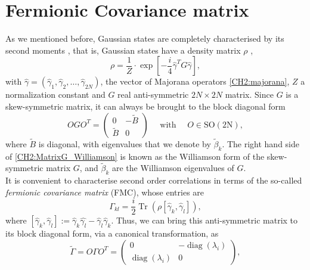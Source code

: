 \section{Fermionic Covariance matrix }
As we mentioned before, Gaussian states are completely characterised by its second moments \cite{westwanski_general_1973,molinari_notes_2017}, that is, Gaussian states have a density matrix $\rho$ \cite{cheong_many-body_2003},
\begin{equation}
\rho= \frac{1}{Z} \cdot \exp \left[-\frac{i}{4} \hat{\gamma}^{T} G \hat{\gamma}\right],
\label{CH2:rho_gaussiano_exp}
\end{equation}
with $\hat{\gamma} = (\hat{\gamma}_1,\hat{\gamma}_2,\ldots,\hat{\gamma}_{2N})$, the vector of Majorana operators \eqref{CH2:majorana}, $Z$ a normalization constant and $G$ real anti-symmetric $2N\times 2N$ matrix. Since $G$ is a skew-symmetric matrix, it can always be brought to the block diagonal form 
\begin{equation}
O G O^{T}=\left(\begin{array}{cc}
0 & -\tilde{B} \\
\tilde{B} & 0
\end{array}\right) \quad \text { with } \quad O \in \mathrm{SO}(2 \mathrm{N}),
\label{CH2:MatrixG_Williamson}
\end{equation}
where $\tilde{B}$ is diagonal, with eigenvalues that we denote by $\tilde{\beta}_k$. The right hand side of \eqref{CH2:MatrixG_Williamson} is known as the Williamson form of the skew-symmetric matrix $G$, and $\tilde{\beta}_k$ are the Williamson eigenvalues of $G$\cite{kraus_pairing_2009}.\\
\indent It is convenient to characterise second order correlations in terms of the so-called \textit{fermionic covariance matrix} (FMC), whose entries are
\begin{equation}
\Gamma_{k l}=\frac{i}{2} \operatorname{Tr}\left(\rho\left[\hat{\gamma}_{k}, \hat{\gamma}_{l}\right]\right),
\label{CH2:Cov_matrix_elements}
\end{equation}
where $\left[\hat{\gamma}_{k}, \hat{\gamma}_{l}\right] := \hat{\gamma}_{k}\hat{\gamma_{l}} - \hat{\gamma}_{l}\hat{\gamma}_{k}$. Thus, we can bring this anti-symmetric matrix to its block diagonal form, via a canonical transformation, as
\begin{equation}
\tilde{\Gamma} = O \Gamma O^{T}=\left(\begin{array}{cc}
0 & -\operatorname{diag}(\lambda_{i}) \\
\operatorname{diag}(\lambda_{i}) & 0
\end{array}\right),
\label{CH2:Williamson_Cov_fermionic_matrix}
\end{equation}

